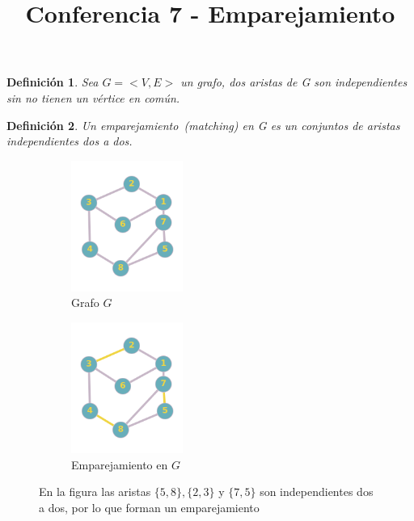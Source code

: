 \documentclass[a4paper,1pt]{report}
\title{Conferencia 7 - Emparejamiento}
\author{}
\newtheorem*{dfn}{Definición}
\begin{document}
\maketitle

\begin{dfn}
 Sea $G=<V,E>$ un grafo, dos aristas de G son independientes sin no tienen un vértice en común.
\end{dfn}


\begin{dfn}
    Un emparejamiento~(\textit{matching}) en G es un conjuntos de aristas independientes dos a dos.
\end{dfn}

\begin{figure}[H]
    \centering
    \begin{subfigure}[b]{0.40\textwidth}
        \centering
        \includegraphics[width=0.4\textwidth]{figures7/grafo.png}
        \caption{Grafo $G$}
    \end{subfigure} 
    \begin{subfigure}[b]{0.40\textwidth}
        \centering
        \includegraphics[width=0.4\textwidth]{figures7/matching.png}
        \caption{Emparejamiento en $G$}
    \end{subfigure}
    \caption{En la figura las aristas $\{ 5,8\}, \{2,3\}$ y $\{7,5\}$ son independientes dos a dos, por lo que forman un emparejamiento}
\end{figure} 
\end{document}
